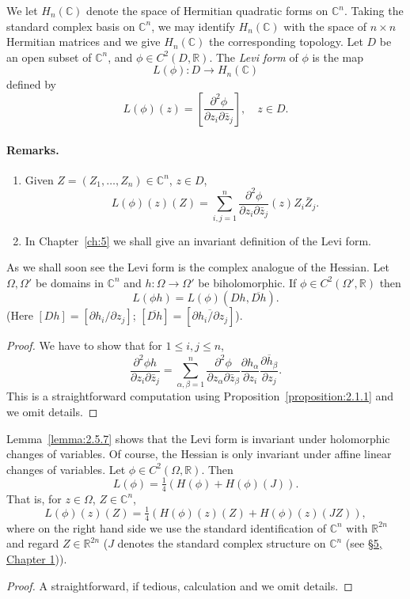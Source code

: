 We let $H_n(\mathbb C)$ denote the space of Hermitian quadratic forms on $\mathbb C^n$. Taking the standard complex basis on $\mathbb C^n$, we may identify $H_n(\mathbb C)$ with the space of $n\times n$ Hermitian matrices and we give $H_n(\mathbb C)$ the corresponding topology.
 Let $D$ be an open subset of $\mathbb C^n$, and $\phi\in C^2(D,\mathbb R)$. The \emph{Levi form} of $\phi$ is the map
\[L(\phi):D\to H_n(\mathbb C)\]
defined by
\[L(\phi)(z)=\left[\frac{\partial^2\phi}{\partial z_i\partial\bar z_j}\right],\quad z\in D.\]
\paragraph*{Remarks.}
\begin{enumerate}
\item Given $Z=(Z_1,\ldots,Z_n)\in\mathbb C^n$, $z\in D$,
\[L(\phi)(z)(Z)=\sum_{i,j=1}^n\frac{\partial^2\phi}{\partial z_i\partial\bar z_j}(z)Z_i\bar Z_j.\]
\item In Chapter~\ref{ch:5} we shall give an invariant definition of the Levi form.
\end{enumerate}
As we shall soon see the Levi form is the complex analogue of the Hessian.
 Let $\Omega,\Omega'$ be domains in $\mathbb C^n$ and $h:\Omega\to\Omega'$ be biholomorphic. If $\phi\in C^2(\Omega',\mathbb R)$ then
\[L(\phi h)=L(\phi)(Dh,\overline{Dh}).\]
(Here $[Dh]=[\partial h_i/\partial z_j]$; $[\overline{Dh}]=[\overline{\partial h_i/\partial z_j}]$).
\begin{proof}
We have to show that for $1\leq i,j\leq n$,
\[\frac{\partial^2\phi h}{\partial z_i\partial\bar z_j}=\sum_{\alpha,\beta=1}^n\frac{\partial^2\phi}{\partial z_\alpha\partial\bar z_\beta}\frac{\partial h_\alpha}{\partial z_i}\overline{\frac{\partial h_\beta}{\partial z_j}}.\]
This is a straightforward computation using Proposition~\ref{proposition:2.1.1} and we omit details.
\end{proof}
Lemma~\ref{lemma:2.5.7} shows that the Levi form is invariant under holomorphic changes of variables. Of course, the Hessian is only invariant under affine linear changes of variables.
 Let $\phi\in C^2(\Omega,\mathbb R)$. Then
\[L(\phi)=\tfrac14(H(\phi)+H(\phi)(J)).\]
That is, for $z\in\Omega$, $Z\in\mathbb C^n$,
\[L(\phi)(z)(Z)=\tfrac14(H(\phi)(z)(Z)+H(\phi)(z)(JZ)),\]
where on the right hand side we use the standard identification of $\mathbb C^n$ with $\mathbb R^{2n}$ and regard $Z\in\mathbb R^{2n}$ ($J$ denotes the standard complex structure on $\mathbb C^n$ (see \hyperref[sec:1:5]{\S5, Chapter 1})).
\begin{proof}
A straightforward, if tedious, calculation and we omit details.
\end{proof}
